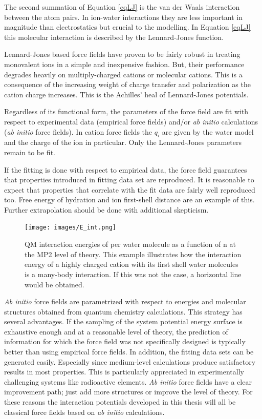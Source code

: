 The second summation of Equation \ref{eqLJ} is the van der Waals interaction between 
the atom pairs. In ion-water interactions they are less important in magnitude than 
electrostatics but crucial to the modelling. In Equation \ref{eqLJ} this molecular interaction 
is described by the Lennard-Jones function.



Lennard-Jones based force fields have proven to be fairly robust in treating monovalent ions 
in a simple and inexpensive fashion. But, their performance degrades heavily on multiply-charged 
cations or molecular cations\cite{Li2017,Li2015,Li2013}. This is a consequence of 
the increasing weight of charge transfer and polarization as the cation charge increases. This 
is the Achilles' heal of Lennard-Jones potentials.


Regardless of its functional form, the parameters of the force field are fit with respect to 
experimental data (empirical force fields) and/or \textit{ab initio} calculations (\textit{ab 
initio} force fields). In cation force fields the $q_i$ are 
given by the water model and the charge of the ion in particular. Only the Lennard-Jones 
parameters remain to be fit. 

If the fitting is done with respect to empirical data, the force field guarantees that 
properties introduced in fitting data set are reproduced. It is reasonable to expect that 
properties that correlate with the fit data are fairly well reproduced too. Free energy of 
hydration and ion first-shell distance are an example of this\cite{Li2015}. Further 
extrapolation should be done with additional skepticism. 

\begin{figure}
     \centering
         \texttt{[image: images/E\_int.png]} 
        \caption[Many body effects in the Po(VI) hydrate.]{QM interaction energies of 
 per water molecule as a function of n at the MP2 level of 
theory.\cite{Ayala2008} This example illustrates how the interaction energy of a highly charged 
cation with its first shell water molecules is a many-body interaction. If this was not the case, 
a horizontal line would be obtained.}
        \label{PoEint}
\end{figure}

\textit{Ab initio} force fields are parametrized with respect to energies and molecular 
structures obtained from quantum chemistry calculations. This strategy has several advantages. 
If the sampling of the system potential energy surface is exhaustive enough and at a 
reasonable level of theory, the prediction of information for which the force field was not 
specifically designed is 
typically better than using empirical force fields. In addition, the fitting data sets can be 
generated easily. Especially since medium-level calculations produce satisfactory results in 
most properties. This is particularly appreciated in experimentally challenging 
systems like radioactive elements. \textit{Ab initio} force fields have a clear improvement 
path; just add more structures or improve the level of theory. For these reasons the 
interaction potentials developed in this thesis will all be classical force fields based on 
\textit{ab initio} calculations.

